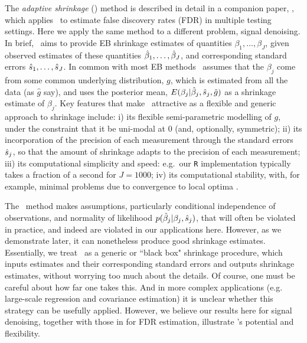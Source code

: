 \documentclass[12pt]{article}
\begin{document}
The {\it adaptive shrinkage} (\ash) method is described in detail in a companion paper, \cite{stephens:2015},
which applies \ash~to estimate false discovery rates (FDR) in multiple testing settings. 
Here we apply the same method to a different problem, signal denoising.  In brief,
\ash~aims to provide EB shrinkage estimates of quantities $\beta_1,\dots,\beta_J$, given observed estimates of these quantities $\hat{\beta}_1,\dots,\hat{\beta}_J$, 
and corresponding standard errors $\hat{s}_1,\dots,\hat{s}_J$. In common with most EB methods \ash~assumes that the $\beta_j$ come from some common underlying distribution, $g$, which is estimated from all the data (as $\hat{g}$ say), and
uses the posterior mean,  $E(\beta_j | \hat{\beta}_j, \hat{s}_j, \hat{g})$ as a shrinkage estimate of $\beta_j$.
Key features that make \ash~attractive as a flexible and generic approach to shrinkage include: 
i) its flexible semi-parametric modelling of $g$, under the constraint that it be uni-modal at 0 (and, optionally, symmetric); ii) its incorporation of the precision of each measurement through the standard errors $\hat{s}_j$, so that the amount of shrinkage adapts to the precision of each measurement;  iii) its computational simplicity and speed: e.g.~our {\tt R} implementation typically takes a fraction of a second for $J=1000$;
iv) its computational stability, with, for example, minimal problems due to convergence to local optima \cite{stephens:2015}. 





The \ash~method makes assumptions, particularly conditional independence of observations, and normality of likelihood $p(\hat{\beta}_j | \beta_j, \hat{s}_j)$, that will often be violated in practice,
and indeed are violated in our applications here. However, as we demonstrate later, it can nonetheless produce good shrinkage estimates. 
Essentially, we treat
\ash~as a generic or ``black box" shrinkage procedure, which inputs
estimates and their corresponding standard errors and outputs shrinkage estimates, without worrying too much about 
the details. Of course, one must be careful about how far one takes this.  And in more complex applications 
(e.g. large-scale regression and covariance estimation) it is unclear whether this strategy can be usefully applied. However,
we believe our results here for signal denoising, together with those in \cite{stephens:15} for FDR estimation, illustrate \ash's potential and flexibility. 
\end{document}
